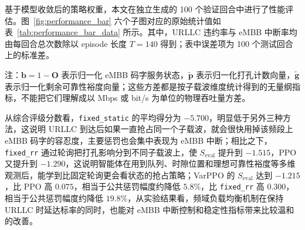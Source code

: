 基于模型收敛后的策略权重，本文在独立生成的 100 个验证回合中进行了性能评估。图~\ref{fig:performance_bar} 六个子图对应的原始统计值如表~\ref{tab:performance_bar_data} 所示。其中，URLLC 违约率与 eMBB 中断率均由每回合总次数除以 episode 长度 \(T=140\) 得到；表中误差项为 100 个测试回合上的标准差。

\begin{table}[H]
\centering
\small
\caption{基础场景下性能柱状图对应的原始评估数据}
\label{tab:performance_bar_data}
\vspace{0.5em}
\begin{minipage}{0.96\textwidth}
\footnotesize
注：\(\mathbf{b}=1-\mathbf{O}\) 表示归一化 eMBB 码字服务状态，\(\tilde{\mathbf{p}}\) 表示归一化打孔计数向量，\(\tilde{\mathbf{g}}\) 表示归一化剩余可靠性裕度向量；这些方差都是按子载波维度统计得到的无量纲指标，不能把它们理解成以 Mbps 或 bit/s 为单位的物理吞吐量方差。
\end{minipage}
\end{table}

从综合评级分数看，\texttt{fixed\_static} 的平均得分为 \(-5.700\)，明显低于另外三种方法，这说明 URLLC 到达后如果一直抢占同一个子载波，就会很快用掉该频段上 eMBB 码字的容忍度，主要惩罚也会集中表现为 eMBB 中断；相比之下，\texttt{fixed\_rr} 通过轮询把打孔影响分到不同子载波上，使 \(S_{\text{eval}}\) 提升到 \(-1.515\)，PPO 又提升到 \(-1.290\)，这说明智能体在用到队列、时隙位置和理想可靠性裕度等多维观测后，能学到比固定轮询更会看状态的抢占策略；VarPPO 的 \(S_{\text{eval}}\) 达到 \(-1.215\)，比 PPO 高 \(0.075\)，相当于公共惩罚幅度约降低 \(5.8\%\)，比 \texttt{fixed\_rr} 高 \(0.300\)，相当于公共惩罚幅度约降低 \(19.8\%\)，从实验结果看，频域负载均衡机制在保持 URLLC 时延达标率的同时，也能对 eMBB 中断控制和稳定性指标带来比较温和的改善。

